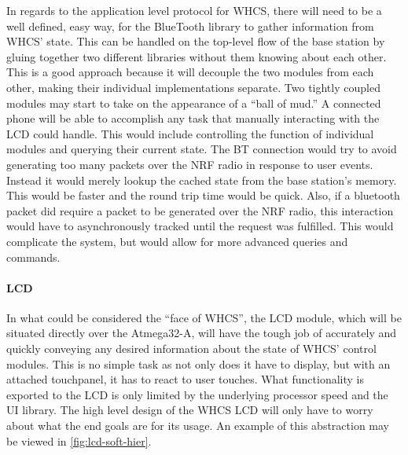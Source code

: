 In regards to the application level protocol for WHCS, there will need to be a
well defined, easy way, for the BlueTooth library to gather information from
WHCS' state. This can be handled on the top-level flow of the base station by
gluing together two different libraries without them knowing about each other.
This is a good approach because it will decouple the two modules from each
other, making their individual implementations separate. Two tightly coupled
modules may start to take on the appearance of a ``ball of mud.'' A connected
phone will be able to accomplish any task that manually interacting with the
LCD could handle. This would include controlling the function of individual
modules and querying their current state. The BT connection would try to avoid
generating too many packets over the NRF radio in response to user events.
Instead it would merely lookup the cached state from the base station's memory.
This would be faster and the round trip time would be quick. Also, if a
bluetooth packet did require a packet to be generated over the NRF radio, this
interaction would have to asynchronously tracked until the request was
fulfilled. This would complicate the system, but would allow for more advanced
queries and commands.

\paragraph{LCD}
In what could be considered the ``face of WHCS'', the LCD module, which will be
situated directly over the Atmega32-A, will have the tough job of accurately
and quickly conveying any desired information about the state of WHCS' control
modules. This is no simple task as not only does it have to display, but with
an attached touchpanel, it has to react to user touches. What functionality is
exported to the LCD is only limited by the underlying processor speed and the
UI library. The high level design of the WHCS LCD will only have to worry about
what the end goals are for its usage. An example of this abstraction may be
viewed in \autoref{fig:lcd-soft-hier}.


